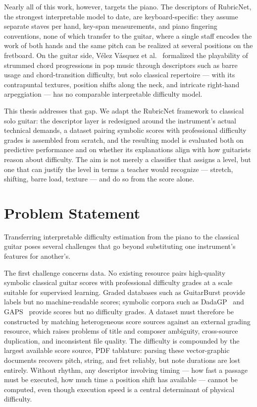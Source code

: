 Nearly all of this work, however, targets the piano. The descriptors of RubricNet, the strongest interpretable model to date, are keyboard-specific: they assume separate staves per hand, key-span measurements, and piano fingering conventions, none of which transfer to the guitar, where a single staff encodes the work of both hands and the same pitch can be realized at several positions on the fretboard. On the guitar side, V{\'e}lez V{\'a}squez et al.~\cite{vasquez2023quantifying} formalized the playability of strummed chord progressions in pop music through descriptors such as barre usage and chord-transition difficulty, but solo classical repertoire --- with its contrapuntal textures, position shifts along the neck, and intricate right-hand arpeggiation --- has no comparable interpretable difficulty model.

This thesis addresses that gap. We adapt the RubricNet framework to classical solo guitar: the descriptor layer is redesigned around the instrument's actual technical demands, a dataset pairing symbolic scores with professional difficulty grades is assembled from scratch, and the resulting model is evaluated both on predictive performance and on whether its explanations align with how guitarists reason about difficulty. The aim is not merely a classifier that assigns a level, but one that can justify the level in terms a teacher would recognize --- stretch, shifting, barre load, texture --- and do so from the score alone.

\section{Problem Statement}
\label{sec:problem_statement}
Transferring interpretable difficulty estimation from the piano to the classical guitar poses several challenges that go beyond substituting one instrument's features for another's.

The first challenge concerns data. No existing resource pairs high-quality symbolic classical guitar scores with professional difficulty grades at a scale suitable for supervised learning. Graded databases such as GuitarBurst provide labels but no machine-readable scores; symbolic corpora such as DadaGP~\cite{sarmento2021dadagp} and GAPS~\cite{riley2024gaps} provide scores but no difficulty grades. A dataset must therefore be constructed by matching heterogeneous score sources against an external grading resource, which raises problems of title and composer ambiguity, cross-source duplication, and inconsistent file quality. The difficulty is compounded by the largest available score source, PDF tablature: parsing these vector-graphic documents recovers pitch, string, and fret reliably, but note durations are lost entirely. Without rhythm, any descriptor involving timing --- how fast a passage must be executed, how much time a position shift has available --- cannot be computed, even though execution speed is a central determinant of physical difficulty.

